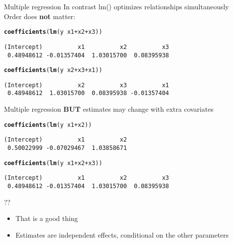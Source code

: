 \documentclass[10pt]{beamer}\usepackage[]{graphicx}\usepackage[]{color}
\makeatletter
\newcommand{\hlopt}[1]{\textcolor[rgb]{0,0,0}{#1}}%
\newcommand{\hlstd}[1]{\textcolor[rgb]{0.345,0.345,0.345}{#1}}%
\newcommand{\hlkwd}[1]{\textcolor[rgb]{0.737,0.353,0.396}{\textbf{#1}}}%
\newenvironment{kframe}{%
 \def\at@end@of@kframe{}%
 \ifinner\ifhmode%
  \def\at@end@of@kframe{\end{minipage}}%
  \begin{minipage}{\columnwidth}%
 \fi\fi%
 \def\FrameCommand##1{\hskip\@totalleftmargin \hskip-\fboxsep
 \colorbox{shadecolor}{##1}\hskip-\fboxsep
     \hskip-\linewidth \hskip-\@totalleftmargin \hskip\columnwidth}%
 \MakeFramed {\advance\hsize-\width
   \@totalleftmargin\z@ \linewidth\hsize
   \@setminipage}}%
 {\par\unskip\endMakeFramed%
 \at@end@of@kframe}
\newenvironment{knitrout}{}{} %
\makeatother
\begin{document}
\begin{frame}[fragile]{Multiple regression}
In contrast lm() optimizes relationships simultaneously\\
Order does \textbf{not} matter:
\begin{knitrout}\small
{}\color{fgcolor}\begin{kframe}
\begin{alltt}
  \hlkwd{coefficients}\hlstd{(}\hlkwd{lm}\hlstd{(y} \hlopt{~} \hlstd{x1} \hlopt{+} \hlstd{x2} \hlopt{+} \hlstd{x3))}
\end{alltt}
\begin{verbatim}
(Intercept)          x1          x2          x3 
 0.48948612 -0.01357404  1.03015700  0.08395938 
\end{verbatim}
\begin{alltt}
  \hlkwd{coefficients}\hlstd{(}\hlkwd{lm}\hlstd{(y} \hlopt{~} \hlstd{x2} \hlopt{+} \hlstd{x3} \hlopt{+} \hlstd{x1))}
\end{alltt}
\begin{verbatim}
(Intercept)          x2          x3          x1 
 0.48948612  1.03015700  0.08395938 -0.01357404 
\end{verbatim}
\end{kframe}
\end{knitrout}

\end{frame}

\begin{frame}[fragile]{Multiple regression}
\textbf{BUT} estimates may change with extra covariates
\begin{knitrout}\small
{}\color{fgcolor}\begin{kframe}
\begin{alltt}
    \hlkwd{coefficients}\hlstd{(}\hlkwd{lm}\hlstd{(y} \hlopt{~} \hlstd{x1} \hlopt{+} \hlstd{x2 ))}
\end{alltt}
\begin{verbatim}
(Intercept)          x1          x2 
 0.50022999 -0.07029467  1.03858671 
\end{verbatim}
\begin{alltt}
    \hlkwd{coefficients}\hlstd{(}\hlkwd{lm}\hlstd{(y} \hlopt{~} \hlstd{x1} \hlopt{+} \hlstd{x2} \hlopt{+} \hlstd{x3))}
\end{alltt}
\begin{verbatim}
(Intercept)          x1          x2          x3 
 0.48948612 -0.01357404  1.03015700  0.08395938 
\end{verbatim}
\end{kframe}
\end{knitrout}
\pause
\begin{block}{??}
  \begin{itemize}
    \item That is a good thing
    \item Estimates are independent effects, conditional on the other parameters
  \end{itemize}
\end{block}
\end{frame}
\end{document}

